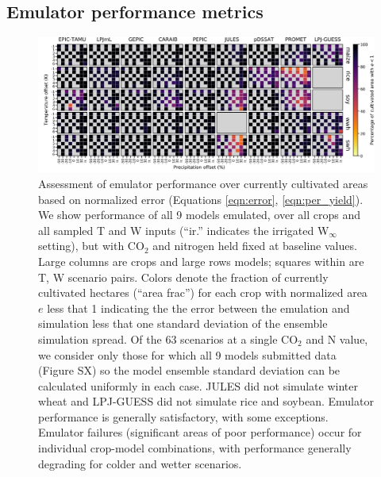 \documentclass[gmd, manuscript]{copernicus} %
\begin{document}
\subsection{Emulator performance metrics}
\begin{figure}[ht]
\centering
    \includegraphics[width=16cm]{figures/error_grid.png}
    \caption{
    Assessment of emulator performance over currently cultivated areas based on normalized error (Equations \ref{eqn:error}, \ref{eqn:per_yield}). 
    We show performance of all 9 models emulated, over all crops and all sampled T and W inputs (``ir.'' indicates the irrigated W$_{\infty}$ setting), but with CO$_2$ and nitrogen held fixed at baseline values. 
    Large columns are crops and large rows models; squares within are T, W scenario pairs. 
    Colors denote the fraction of currently cultivated hectares (``area frac'') for each crop with normalized area $e$ less that 1 indicating the the error between the emulation and simulation less that one standard deviation of the ensemble simulation spread. 
    Of the 63 scenarios at a single CO$_2$ and N value, we consider only those for which all 9 models submitted data (Figure SX) so the model ensemble standard deviation can be calculated uniformly in each case. 
    JULES did not simulate winter wheat and LPJ-GUESS did not simulate rice and soybean. Emulator performance is generally satisfactory, with some exceptions. 
    Emulator failures (significant areas of poor performance) occur for individual crop-model combinations, with performance generally degrading for colder and wetter scenarios.
    }
   \label{fig:error_360}
\end{figure}
\end{document}
